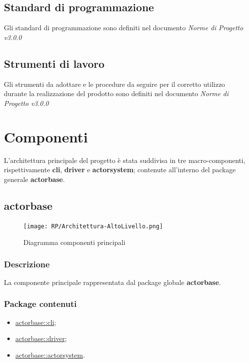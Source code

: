\documentclass{scalatekids-article}
\begin{document}

\subsection{Standard di programmazione}
Gli standard di programmazione sono definiti nel documento \textit{Norme di Progetto v3.0.0}

\subsection{Strumenti di lavoro}
Gli strumenti da adottare e le procedure da seguire per il corretto utilizzo
durante la realizzazione del prodotto sono definiti nel documento \textit{Norme
  di Progetto v3.0.0}

\section{Componenti}

L'architettura principale del progetto è stata suddivisa in tre macro-componenti, rispettivamente
\textbf{cli}, \textbf{driver} e \textbf{actorsystem}; contenute all'interno del package
generale \textbf{actorbase}.

\subsection{actorbase}
\label{sec:actorbase}

\begin{figure}[H]
  \begin{center}
    \texttt{[image: RP/Architettura-AltoLivello.png]}
    \caption{Diagramma componenti principali}
  \end{center}
\end{figure}

\subsubsection{Descrizione}

La componente principale rappresentata dal package globale \textbf{actorbase}.

\subsubsection{Package contenuti}

\begin{itemize}
\item \hyperref[sec:actorbase::cli]{actorbase::cli};
\item \hyperref[sec:actorbase::driver]{actorbase::driver};
\item \hyperref[sec:actorbase::actorsystem]{actorbase::actorsystem}.
\end{itemize}
\end{document}
